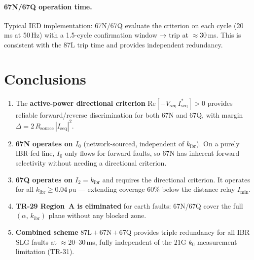 \documentclass[11pt,a4paper]{article}
\begin{document}
\paragraph{67N/67Q operation time.}
Typical IED implementation: 67N/67Q evaluate the criterion on each cycle
(20\,ms at 50\,Hz) with a 1.5-cycle confirmation window → trip at $\approx 30$\,ms.
This is consistent with the 87L trip time and provides independent redundancy.

\section{Conclusions}
\label{sec:conclusions}

\begin{enumerate}
  \item The \textbf{active-power directional criterion}
        $\mathrm{Re}[-V_\mathrm{seq}\,I_\mathrm{seq}^*] > 0$ provides reliable
        forward/reverse discrimination for both 67N and 67Q, with margin
        $\Delta = 2\,R_\mathrm{source}\,|I_\mathrm{seq}|^2$.
  \item \textbf{67N operates on $I_0$} (network-sourced, independent of
        $k_\mathrm{ibr}$).  On a purely IBR-fed line, $I_0$ only flows for forward
        faults, so 67N has inherent forward selectivity without needing a
        directional criterion.
  \item \textbf{67Q operates on $I_2 = k_\mathrm{ibr}$} and requires the
        directional criterion.  It operates for all $k_\mathrm{ibr} \geq 0.04$\,pu
        --- extending coverage 60\% below the distance relay $I_\mathrm{min}$.
  \item \textbf{TR-29 Region~A is eliminated} for earth faults: 67N/67Q cover the
        full $({\alpha},\,k_\mathrm{ibr})$ plane without any blocked zone.
  \item \textbf{Combined scheme} 87L\,$+$\,67N\,$+$\,67Q provides triple
        redundancy for all IBR SLG faults at $\approx 20$--$30$\,ms, fully
        independent of the 21G $k_0$ measurement limitation (TR-31).
\end{enumerate}



\end{document}
